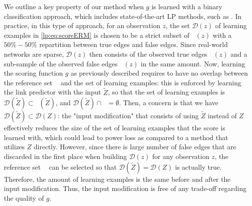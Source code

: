 \documentclass[a4paper, 11pt]{article}
\theoremstyle{remark}
\DeclareMathOperator{\Dtr}{\cD_{\text{train}}}
\DeclareMathOperator{\Dcal}{\cD_{\text{cal}}}
\DeclareMathOperator{\DtrNull}{\cD^0_{\text{train}}}
\DeclareMathOperator{\DtrAlt}{\cD^1_{\text{train}}}
\newcommand{\EM}{\ensuremath}
\newcommand{\cD}{\EM{\mathcal{D}}}
\begin{document}
We outline a key property of our method when $g$ is learned with a binary classification approach, which includes state-of-the-art LP methods, such as \cite{zhang2018link}. In practice, in this type of approach, for an observation $z$, the set $\cD(z)$ of learning examples in \eqref{lp:eq:scoreERM} is chosen to be a strict subset of $\Dtr(z)$ with a $50\%-50\%$ repartition between true edges and false edges. 
Since real-world networks are sparse, $\cD(z)$ then consists of the observed true edges $\DtrAlt(z)$ and a sub-sample of the observed false edges $\DtrNull(z)$ in the same amount.
Now, learning the scoring function $g$ as previously described requires to have no overlap between the reference set $\Dcal$ and the set of learning examples: this is enforced by learning the link predictor with the input $\tilde Z$, so that the set of learning examples is $\cD(\tilde Z) \subset \Dtr(\tilde Z)$, and $\cD (\tilde Z) \cap \Dcal = \emptyset$. Then, a concern is that we have $\cD(\tilde Z) \subset \cD(Z)$: the "input modification" that consists of using $\tilde Z$ instead of $Z$ effectively reduces the size of the set of learning examples that the score is learned with, which could lead to power loss as compared to a method that utilizes $Z$ directly. 
However, since there is large number of false edges that are discarded in the first place when building $\cD(z)$ for any observation $z$, the reference set $\Dcal$ can be selected so that $\cD(\tilde Z) = \cD(Z)$ is actually true. Therefore, the amount of learning examples is the same before and after the input modification. Thus, the input modification is free of any trade-off regarding the quality of $g$. 
\end{document}
